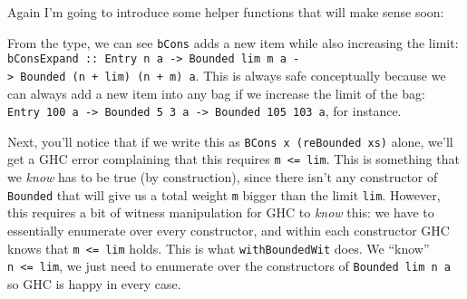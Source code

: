 \documentclass[]{article}
\newenvironment{Shaded}{}{}
\newcommand{\CommentTok}[1]{\textcolor[rgb]{0.38,0.63,0.69}{\textit{#1}}}
\newcommand{\DataTypeTok}[1]{\textcolor[rgb]{0.56,0.13,0.00}{#1}}
\newcommand{\KeywordTok}[1]{\textcolor[rgb]{0.00,0.44,0.13}{\textbf{#1}}}
\newcommand{\NormalTok}[1]{#1}
\newcommand{\OperatorTok}[1]{\textcolor[rgb]{0.40,0.40,0.40}{#1}}
\newcommand{\OtherTok}[1]{\textcolor[rgb]{0.00,0.44,0.13}{#1}}
\begin{document}
Again I'm going to introduce some helper functions that will make sense soon:

\begin{Shaded}
\end{Shaded}

From the type, we can see \texttt{bCons} adds a new item while also increasing
the limit:
\texttt{bConsExpand\ ::\ Entry\ n\ a\ -\textgreater{}\ Bounded\ lim\ m\ a\ -\textgreater{}\ Bounded\ (n\ +\ lim)\ (n\ +\ m)\ a}.
This is always safe conceptually because we can always add a new item into any
bag if we increase the limit of the bag:
\texttt{Entry\ 100\ a\ -\textgreater{}\ Bounded\ 5\ 3\ a\ -\textgreater{}\ Bounded\ 105\ 103\ a},
for instance.

Next, you'll notice that if we write this as \texttt{BCons\ x\ (reBounded\ xs)}
alone, we'll get a GHC error complaining that this requires
\texttt{m\ \textless{}=\ lim}. This is something that we \emph{know} has to be
true (by construction), since there isn't any constructor of \texttt{Bounded}
that will give us a total weight \texttt{m} bigger than the limit \texttt{lim}.
However, this requires a bit of witness manipulation for GHC to \emph{know}
this: we have to essentially enumerate over every constructor, and within each
constructor GHC knows that \texttt{m\ \textless{}=\ lim} holds. This is what
\texttt{withBoundedWit} does. We ``know'' \texttt{n\ \textless{}=\ lim}, we just
need to enumerate over the constructors of \texttt{Bounded\ lim\ n\ a} so GHC is
happy in every case.
\end{document}
